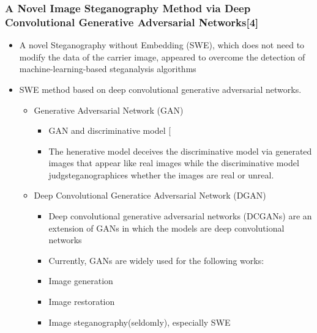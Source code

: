 \documentclass{beamer} %
\theoremstyle{definition} %
\begin{document}
\begin{frame}
\frametitle{A Novel Image Steganography Method via Deep Convolutional Generative Adversarial Networks[4]  }
\begin{itemize}
	\item A novel Steganography without Embedding (SWE), which does not need to modify the data of the carrier image, appeared to overcome the detection of machine-learning-based steganalysis algorithms 
	\item SWE method based on deep convolutional generative adversarial networks.
	\begin{itemize}
		\item Generative Adversarial Network (GAN)
		\begin{itemize}
		    \item  GAN and discriminative model [ 
		    \item The henerative model deceives the discriminative model via generated images that appear like real images while the discriminative
		    model judgsteganographices whether the images are real or unreal. 
		\end{itemize}
		\item Deep Convolutional Generatice Adversarial Network (DGAN)
		\begin{itemize}
		    \item Deep convolutional generative adversarial networks (DCGANs) are an extension of GANs in which the models are deep convolutional networks 
		    \item Currently, GANs are widely used for the following works: 
		    \item Image generation 
		    \item Image restoration
		    \item Image steganography(seldomly), especially SWE  
		\end{itemize}
			\end{itemize}
		\end{itemize}
\end{frame}
\end{document}
